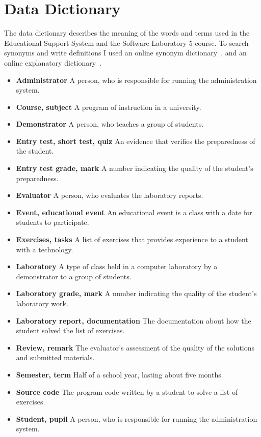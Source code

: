 \chapter{Data Dictionary}
\label{data-dictionary}

The data dictionary describes the meaning of the words and terms used in the Educational Support System and the Software Laboratory 5 course. To search synonyms and write definitions I used an online synonym dictionary~\cite{Thesaurus}, and an online explanatory  dictionary~\cite{Dictionary}.

\begin{itemize}
	\item \textbf{Administrator} A person, who is responsible for running the administration system.
	\item \textbf{Course, subject} A program of instruction in a university.
	\item \textbf{Demonstrator} A person, who teaches a group of students.
	\item \textbf{Entry test, short test, quiz} An evidence that verifies the preparedness of the student.
	\item \textbf{Entry test grade, mark} A number indicating the quality of the student's preparedness.
	\item \textbf{Evaluator} A person, who evaluates the laboratory reports.
	\item \textbf{Event, educational event} An educational event is a class with a date for students to participate.
	\item \textbf{Exercises, tasks} A list of exercises that provides experience to a student with a technology.
	\item \textbf{Laboratory} A type of class held in a computer laboratory by a demonstrator to a group of students.
	\item \textbf{Laboratory grade, mark} A number indicating the quality of the student's laboratory work.
	\item \textbf{Laboratory report, documentation} The documentation about how the student  solved the list of exercises.
	\item \textbf{Review, remark} The evaluator's assessment of the quality of the solutions and submitted materials.
	\item \textbf{Semester, term} Half of a school year, lasting about five months.
	\item \textbf{Source code} The program code written by a student to solve a list of exercises.
	\item \textbf{Student, pupil} A person, who is responsible for running the administration system.
\end{itemize}

